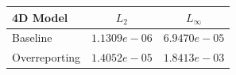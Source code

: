 \begin{table}[ht]
\centering
\begin{tabular}{lcc}
\hline
4D Model & $L_2$ & $L_\infty$ \\
\hline
Baseline & $1.1309e-06$ & $6.9470e-05$ \\
Overreporting & $1.4052e-05$ & $1.8413e-03$ \\
\hline
\end{tabular}
\end{table}
